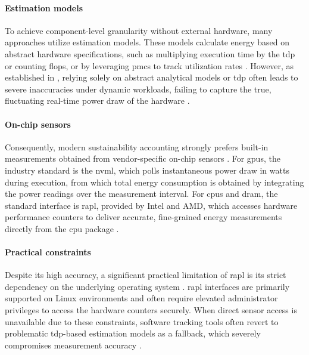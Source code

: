 \paragraph{Estimation models} To achieve component-level granularity without external hardware, many approaches utilize estimation models. These models calculate energy based on abstract hardware specifications, such as multiplying execution time by the \gls{tdp} or counting \glspl{flop}, or by leveraging \glspl{pmc} to track utilization rates \parencite{rodriguezEvaluatingEnergyConsumption2024}. However, as established in , relying solely on abstract analytical models or \gls{tdp} often leads to severe inaccuracies under dynamic workloads, failing to capture the true, fluctuating real-time power draw of the hardware \parencite{hendersonSystematicReportingEnergy2020}.

\paragraph{On-chip sensors} Consequently, modern sustainability accounting strongly prefers built-in measurements obtained from vendor-specific on-chip sensors \parencite{hendersonSystematicReportingEnergy2020}. For \glspl{gpu}, the industry standard is the \gls{nvml}, which polls instantaneous power draw in watts during execution, from which total energy consumption is obtained by integrating the power readings over the measurement interval. For \glspl{cpu} and \gls{dram}, the standard interface is \gls{rapl}, provided by Intel and AMD, which accesses hardware performance counters to deliver accurate, fine-grained energy measurements directly from the \gls{cpu} package \parencite{rodriguezEvaluatingEnergyConsumption2024}.

\paragraph{Practical constraints} Despite its high accuracy, a significant practical limitation of \gls{rapl} is its strict dependency on the underlying operating system \parencite{hendersonSystematicReportingEnergy2020}. \Gls{rapl} interfaces are primarily supported on Linux environments and often require elevated administrator privileges to access the hardware counters securely. When direct sensor access is unavailable due to these constraints, software tracking tools often revert to problematic \gls{tdp}-based estimation models as a fallback, which severely compromises measurement accuracy \parencite{rodriguezEvaluatingEnergyConsumption2024}.


